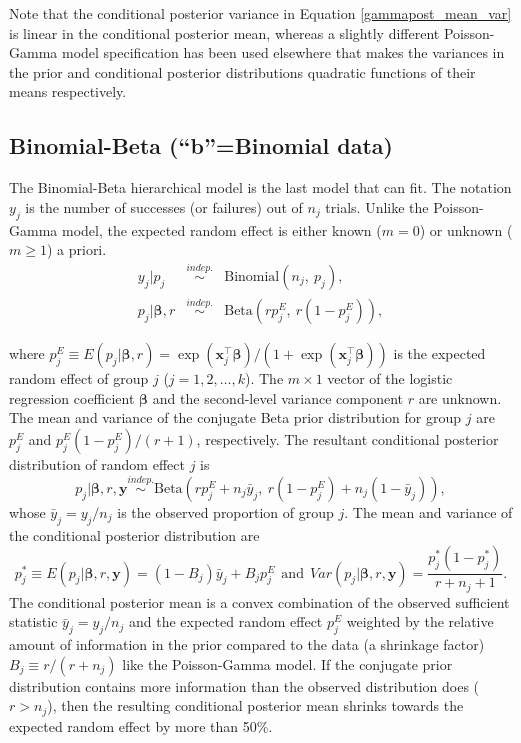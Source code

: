 \documentclass[article]{jss}
\begin{document}
Note that the conditional posterior variance in Equation \ref{gammapost_mean_var} is linear in the conditional posterior mean, whereas a slightly different Poisson-Gamma model specification has been used elsewhere \citep{morris1997} that makes the variances in the prior and conditional posterior distributions  quadratic functions of their means respectively.

\subsection[Binomial-Beta]{Binomial-Beta (``b''=Binomial data)}
The Binomial-Beta hierarchical model is the last model that  can fit. The notation $y_{j}$ is the number of successes (or failures) out of $n_{j}$ trials. Unlike the Poisson-Gamma model, the expected random effect is either known ($m=0$) or unknown ($m\ge1$) a priori.
\begin{eqnarray}
y_{j} \vert p_{j} &\stackrel{indep.}{\sim}& \textrm{Binomial}(n_{j}, ~p_{j}),\\
p_{j} \vert \boldsymbol{\beta}, r &\stackrel{indep.}{\sim}&\textrm{Beta}(rp^E_j,~ r(1-p^E_j)),
\end{eqnarray}

where $p^E_j\equiv E(p_j\vert \boldsymbol{\beta}, r)=\exp(\boldsymbol{x}_j^\top\boldsymbol{\beta})/(1+\exp(\boldsymbol{x}_j^\top\boldsymbol{\beta}))$ is the expected random effect  of group $j$ ($j=1, 2, \ldots, k$). The $m\times 1$ vector of the logistic regression coefficient $\boldsymbol{\beta}$ and the second-level variance component $r$ are unknown. The mean and variance of the conjugate Beta prior distribution for group $j$ are $p^E_j$ and $p^E_j(1-p^E_j)/(r+1)$, respectively.  The resultant conditional posterior distribution of random effect $j$  is
\begin{equation} \label{betapost}
p_{j}\vert  \boldsymbol{\beta}, r, \boldsymbol{y} \stackrel{indep.}{\sim}\textrm{Beta}(rp^E_j+n_{j}\bar{y}_{j},~r(1-p^E_j)+n_{j}(1-\bar{y}_{j})),
\end{equation}
whose $\bar{y}_j=y_j/n_j$ is the observed proportion of group $j$. The mean and variance of the conditional posterior distribution are
\begin{equation}\label{betapost_mean_var}
p_j^\ast\equiv E(p_j\vert \boldsymbol{\beta}, r, \boldsymbol{y} )=(1-B_{j})\bar{y}_{j} + B_{j}p^E_j~~\textrm{and}~~Var(p_j\vert  \boldsymbol{\beta}, r,  \boldsymbol{y})=\frac{p_j^\ast(1-p_j^\ast)}{r+n_j+1}.
\end{equation}
The conditional posterior mean is  a convex combination of the observed sufficient statistic $\bar{y}_{j} = y_j/n_j$ and the expected random effect  $p^E_j$ weighted by the relative amount of information in the prior compared to the data (a shrinkage factor) $B_j\equiv r / (r + n_j)$ like the Poisson-Gamma model.  If the conjugate prior distribution contains more information than the observed distribution does ($r>n_j$), then the resulting conditional posterior mean shrinks towards the expected random effect by more than 50\%.
\end{document}
